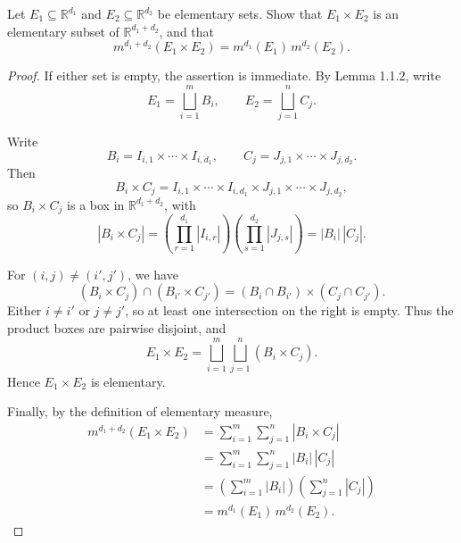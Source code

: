 \begin{exercise}
Let $E_1 \subseteq \mathbb{R}^{d_1}$ and
$E_2 \subseteq \mathbb{R}^{d_2}$ be elementary sets.
Show that $E_1 \times E_2$ is an elementary subset of
$\mathbb{R}^{d_1+d_2}$, and that
\[
m^{d_1+d_2}(E_1 \times E_2)
=
m^{d_1}(E_1)\,m^{d_2}(E_2).
\]
\end{exercise}

\begin{proof}
If either set is empty, the assertion is immediate.
By Lemma 1.1.2, write
\[
E_1 = \bigsqcup_{i=1}^m B_i,
\qquad
E_2 = \bigsqcup_{j=1}^n C_j.
\]

\par\noindent Write
\[
B_i = I_{i,1}\times\cdots\times I_{i,d_1},
\qquad
C_j = J_{j,1}\times\cdots\times J_{j,d_2}.
\]
Then
\[
B_i\times C_j
=
I_{i,1}\times\cdots\times I_{i,d_1}
\times J_{j,1}\times\cdots\times J_{j,d_2},
\]
so $B_i\times C_j$ is a box in $\mathbb{R}^{d_1+d_2}$, with
\[
|B_i\times C_j|
=
\left(\prod_{r=1}^{d_1}|I_{i,r}|\right)
\left(\prod_{s=1}^{d_2}|J_{j,s}|\right)
=
|B_i|\,|C_j|.
\]

\par\noindent For $(i,j)\neq(i',j')$, we have
\[
(B_i\times C_j)\cap(B_{i'}\times C_{j'})
=
(B_i\cap B_{i'})\times(C_j\cap C_{j'}).
\]
Either $i\neq i'$ or $j\neq j'$, so at least one intersection
on the right is empty. Thus the product boxes are pairwise
disjoint, and
\[
E_1\times E_2
=
\bigsqcup_{i=1}^m\bigsqcup_{j=1}^n (B_i\times C_j).
\]
Hence $E_1\times E_2$ is elementary.

\par\noindent Finally, by the definition of elementary measure,
\[
\begin{aligned}
m^{d_1+d_2}(E_1\times E_2)
&=\sum_{i=1}^m\sum_{j=1}^n |B_i\times C_j|\\
&=\sum_{i=1}^m\sum_{j=1}^n |B_i|\,|C_j|\\
&=\left(\sum_{i=1}^m |B_i|\right)
  \left(\sum_{j=1}^n |C_j|\right)\\
&=m^{d_1}(E_1)\,m^{d_2}(E_2).
\end{aligned}
\]
\end{proof}
